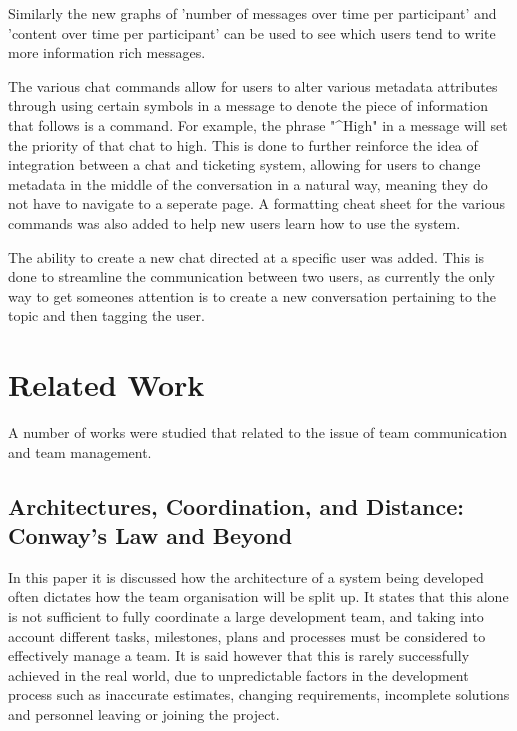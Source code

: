 \documentclass{l4proj}
\begin{document}
Similarly the new graphs of 'number of messages over time per participant' and 'content over time per participant' can be used to see which users tend to write more information rich messages.

The various chat commands allow for users to alter various metadata attributes through using certain symbols in a message to denote the piece of information that follows is a command.  For example, the phrase "^High" in a message will set the priority of that chat to high.  This is done to further reinforce the idea of integration between a chat and ticketing system, allowing for users to change metadata in the middle of the conversation in a natural way, meaning they do not have to navigate to a seperate page.  A formatting cheat sheet for the various commands was also added to help new users learn how to use the system.

The ability to create a new chat directed at a specific user was added.  This is done to streamline the communication between two users, as currently the only way to get someones attention is to create a new conversation pertaining to the topic and then tagging the user.









\chapter{Related Work}
A number of works were studied that related to the issue of team communication and team management.

\section{Architectures, Coordination, and Distance: Conway's Law and Beyond}

In this paper it is discussed how the architecture of a system being developed often dictates how the team organisation will be split up.  It states that this alone is not sufficient to fully coordinate a large development team, and taking into account different tasks, milestones, plans and processes must be considered to effectively manage a team.  It is said however that this is rarely successfully achieved in the real world, due to unpredictable factors in the development process such as inaccurate estimates, changing requirements, incomplete solutions and personnel leaving or joining the project.  
\end{document}
